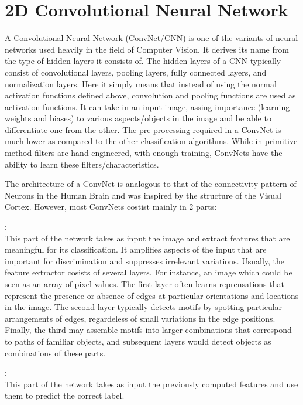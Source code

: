 \documentclass{report}
\begin{document}
\section {2D Convolutional Neural Network}
A Convolutional Neural Network (ConvNet/CNN) is one of the variants of neural networks used heavily in the field of Computer Vision. It
derives its name from the type of hidden layers it consists of. The hidden layers of a CNN typically consist of convolutional layers, pooling
layers, fully connected layers, and normalization layers. Here it simply means that instead of using the normal activation functions defined
above, convolution and pooling functions are used as activation functions.
It can take in an input image, assing importance (learning weights and biases) to various aspects/objects in the image and be able to
differentiate one from the other. The pre-processing required in a ConvNet is much lower as compared to the other classification algorithms.
While in primitive method filters are hand-engineered, with enough training, ConvNets have the ability to learn these filters/characteristics.

The architecture of a ConvNet is analogous to that of the connectivity pattern of Neurons in the Human Brain and was inspired by the
structure of the Visual Cortex. However, most ConvNets costist mainly in 2 parts:
\begin{description}[font=$\bullet$\scshape\bfseries]
\item [ Feature extractor] : \\
  This part of the network takes as input the image and extract features that are meaningful for its classification. It amplifies aspects
  of the input that are important for discrimination and suppresses irrelevant variations. Usually, the feature extractor cosists of
  several layers. For instance, an image which could be seen as an array of pixel values. The first layer often learns reprensations
  that represent the presence or absence of edges at particular orientations and locations in the image. The second layer typically
  detects motifs by spotting particular arrangements of edges, regardeless of small variations in the edge positions. Finally, the third
  may assemble motifs into larger combinations that correspond to paths of familiar objects, and subsequent layers would detect objects
  as combinations of these parts.
  
\item [ Classifier ] : \\
  This part of the network takes as input the previously computed features and use them to predict the correct label.
\end{description}
\end{document}
